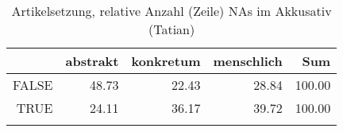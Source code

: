 \begin{table}[ht]
\centering
\begin{tabular}{rrrrr}
  \lsptoprule
 & abstrakt & konkretum & menschlich & Sum \\ 
  \midrule
FALSE & 48.73 & 22.43 & 28.84 & 100.00 \\ 
  TRUE & 24.11 & 36.17 & 39.72 & 100.00 \\ 
   \lspbottomrule
\end{tabular}
\caption{Artikelsetzung, relative Anzahl (Zeile) NAs im Akkusativ (Tatian)} 
\end{table}
